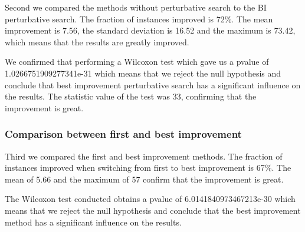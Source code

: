 \documentclass[a4paper,12pt]{article}
\begin{document}
Second we compared the methods without perturbative search to the BI perturbative search. The fraction of instances improved is 72\%. The mean improvement is 7.56, the standard deviation is 16.52 and the maximum is 73.42, which means that the results are greatly improved.

We confirmed that performing a Wilcoxon test which gave us a pvalue of 1.0266751909277341e-31 which means that we reject the null hypothesis and conclude that best improvement perturbative search has a significant influence on the results. The statistic value of the test was 33, confirming that the improvement is great.

\subsubsection{Comparison between first and best improvement}

Third we compared the first and best improvement methods. The fraction of instances improved when switching from first to best improvement is 67\%. The mean of 5.66 and the maximum of 57 confirm that the improvement is great.

The Wilcoxon test conducted obtains a pvalue of 6.0141840973467213e-30 which means that we reject the null hypothesis and conclude that the best improvement method has a significant influence on the results.


\end{document}
